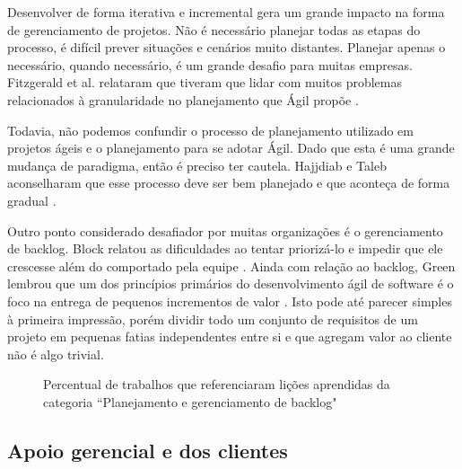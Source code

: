 Desenvolver de forma iterativa e incremental gera um grande impacto na forma de gerenciamento de projetos. Não é necessário planejar todas as etapas do processo, é difícil prever situações e cenários muito distantes. Planejar apenas o necessário, quando necessário, é um grande desafio para muitas empresas. Fitzgerald et al. relataram que tiveram que lidar com muitos problemas relacionados à granularidade no planejamento que Ágil propõe \cite{Fitzgerald2013}.

Todavia, não podemos confundir o processo de planejamento utilizado em projetos ágeis e o planejamento para se adotar Ágil. Dado que esta é uma grande mudança de paradigma, então é preciso ter cautela. Hajjdiab e Taleb aconselharam que esse processo deve ser bem planejado e que aconteça de forma gradual \cite{Hajjdiab2011}.

Outro ponto considerado desafiador por muitas organizações é o gerenciamento de backlog. Block relatou as dificuldades ao tentar priorizá-lo e impedir que ele crescesse além do comportado pela equipe \cite{Block2011}. Ainda com relação ao backlog, Green lembrou que um dos princípios primários do desenvolvimento ágil de software é o foco na entrega de pequenos incrementos de valor \cite{Adobe2012}. Isto pode até parecer simples à primeira impressão, porém dividir todo um conjunto de requisitos de um projeto em pequenas fatias independentes entre si e que agregam valor ao cliente não é algo trivial.

\begin{figure}[H]
	\centering
	\captionsetup{justification=centering}
	\caption{Percentual de trabalhos que referenciaram lições aprendidas da categoria ``Planejamento e gerenciamento de backlog"}
	\label{fig:backlog}
\end{figure}

\subsection{Apoio gerencial e dos clientes}

